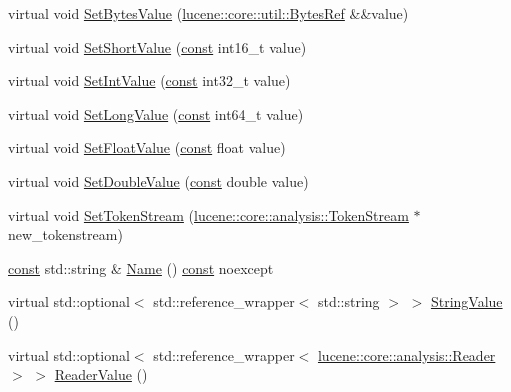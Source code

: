 \begin{DoxyCompactItemize}
\item 
virtual void \mbox{\hyperlink{classlucene_1_1core_1_1document_1_1Field_af61fb82abf8a917ccd5c9f252dcfa447}{Set\+Bytes\+Value}} (\mbox{\hyperlink{classlucene_1_1core_1_1util_1_1BytesRef}{lucene\+::core\+::util\+::\+Bytes\+Ref}} \&\&value)
\item 
virtual void \mbox{\hyperlink{classlucene_1_1core_1_1document_1_1Field_a1f513eaae4357667bcdbacb211fa3bff}{Set\+Short\+Value}} (\mbox{\hyperlink{ZlibCrc32_8h_a2c212835823e3c54a8ab6d95c652660e}{const}} int16\+\_\+t value)
\item 
virtual void \mbox{\hyperlink{classlucene_1_1core_1_1document_1_1Field_a6aee080f0bf507f8c6a5cfc64bd913a2}{Set\+Int\+Value}} (\mbox{\hyperlink{ZlibCrc32_8h_a2c212835823e3c54a8ab6d95c652660e}{const}} int32\+\_\+t value)
\item 
virtual void \mbox{\hyperlink{classlucene_1_1core_1_1document_1_1Field_a949822599f392fb7fca20423902e535a}{Set\+Long\+Value}} (\mbox{\hyperlink{ZlibCrc32_8h_a2c212835823e3c54a8ab6d95c652660e}{const}} int64\+\_\+t value)
\item 
virtual void \mbox{\hyperlink{classlucene_1_1core_1_1document_1_1Field_aa22291dffcf6a545fd6c24f23fbb8b50}{Set\+Float\+Value}} (\mbox{\hyperlink{ZlibCrc32_8h_a2c212835823e3c54a8ab6d95c652660e}{const}} float value)
\item 
virtual void \mbox{\hyperlink{classlucene_1_1core_1_1document_1_1Field_a8db791d4d1ebf77288d8529214413810}{Set\+Double\+Value}} (\mbox{\hyperlink{ZlibCrc32_8h_a2c212835823e3c54a8ab6d95c652660e}{const}} double value)
\item 
virtual void \mbox{\hyperlink{classlucene_1_1core_1_1document_1_1Field_adfb4f4d5a2b2a8c9334186c93fd20c3b}{Set\+Token\+Stream}} (\mbox{\hyperlink{classlucene_1_1core_1_1analysis_1_1TokenStream}{lucene\+::core\+::analysis\+::\+Token\+Stream}} $\ast$new\+\_\+tokenstream)
\item 
\mbox{\hyperlink{ZlibCrc32_8h_a2c212835823e3c54a8ab6d95c652660e}{const}} std\+::string \& \mbox{\hyperlink{classlucene_1_1core_1_1document_1_1Field_a9b6d39e8c30c59bfe0556c38beeeb06e}{Name}} () \mbox{\hyperlink{ZlibCrc32_8h_a2c212835823e3c54a8ab6d95c652660e}{const}} noexcept
\item 
virtual std\+::optional$<$ std\+::reference\+\_\+wrapper$<$ std\+::string $>$ $>$ \mbox{\hyperlink{classlucene_1_1core_1_1document_1_1Field_a6b300229888f74a4cd76c40346c04234}{String\+Value}} ()
\item 
virtual std\+::optional$<$ std\+::reference\+\_\+wrapper$<$ \mbox{\hyperlink{classlucene_1_1core_1_1analysis_1_1Reader}{lucene\+::core\+::analysis\+::\+Reader}} $>$ $>$ \mbox{\hyperlink{classlucene_1_1core_1_1document_1_1Field_a06a7e8bad6d98767adee5e0e42941f06}{Reader\+Value}} ()

\end{DoxyCompactItemize}
